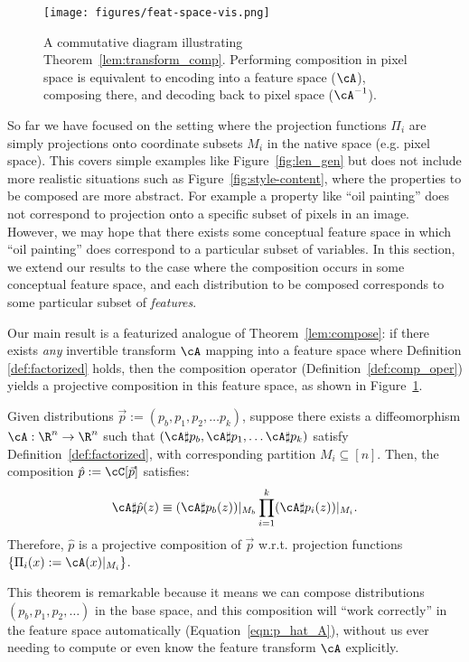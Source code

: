 \begin{figure}
    \centering
    \texttt{[image: figures/feat-space-vis.png]}
    \caption{A commutative diagram illustrating Theorem~\ref{lem:transform_comp}.
    Performing composition in pixel space is equivalent 
    to encoding into a feature space ($\cA$),
    composing there,
    and decoding back
    to pixel space ($\cA^{-1}$).
    }
    \label{fig:feat-space-vis}
\end{figure}

So far we have focused on the setting where the projection functions $\Pi_i$ are simply projections onto coordinate subsets $M_i$ in the native space (e.g. pixel space).
This covers simple examples like Figure~\ref{fig:len_gen} but does not include more realistic situations such as Figure~\ref{fig:style-content},
where the properties to be composed are more abstract.
For example a property like ``oil painting'' does not correspond to projection
onto a specific subset of pixels in an image.
However, we may hope that there exists some conceptual feature space
in which ``oil painting'' does correspond to a particular subset of variables.
In this section, we extend our results to the case where the composition occurs in some conceptual feature space, and each distribution to be composed
corresponds to some particular subset of \emph{features}.


Our main result is a featurized analogue of Theorem~\ref{lem:compose}:
if there exists \emph{any} invertible transform $\cA$
mapping into a feature space
where Definition \ref{def:factorized} holds,
then the composition operator (Definition~\ref{def:comp_oper})
yields a projective composition in this feature space, as shown in Figure~\ref{fig:feat-space-vis}.

\begin{theorem}
\label{lem:transform_comp}
Given distributions $\vec{p} := (p_b, p_1, p_2, \dots p_k)$,
suppose there exists a diffeomorphism $\cA: \R^n \to \R^n$
such that
$(\cA \sharp p_b, \cA \sharp p_1, \dots \cA \sharp p_k)$
satisfy Definition~\ref{def:factorized},
with corresponding partition $M_i \subseteq [n]$.
Then, the composition $\hat{p} := \cC[\vec{p}]$ satisfies:
\begin{align}
\label{eqn:p_hat_A}
\cA \sharp \hat{p}(z)
\equiv
(\cA \sharp p_b (z))|_{M_b} \prod_{i=1}^k (\cA \sharp p_i(z))|_{M_i}.
\end{align}
Therefore, $\hat{p}$
is a projective composition of $\vec{p}$ w.r.t. projection functions
$\{\Pi_i(x) := \cA(x)|_{M_i}\}$.
\end{theorem}
This theorem is remarkable because it means we can
compose distributions $(p_b, p_1, p_2, \dots)$ in the base space,
and this composition will ``work correctly'' in the feature space
automatically (Equation~\ref{eqn:p_hat_A}),
without us ever needing to compute or even know the feature transform $\cA$
explicitly.



